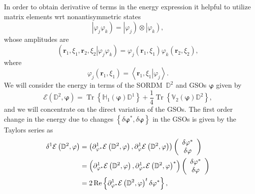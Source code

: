 \documentclass[aps,preprint]{revtex4}%
\begin{document}
In order to obtain derivative of terms in the energy expression it helpful to
utilize matrix elements wrt nonantisymmetric states
\begin{equation}
\left\vert \varphi_{j}\varphi_{k}\right)  =\left\vert \varphi_{j}\right)
\otimes\left\vert \varphi_{k}\right)  ,
\end{equation}
whose amplitudes are
\begin{equation}
\left(  \left.  \mathbf{r}_{1},\xi_{1},\mathbf{r}_{2},\xi_{2}\right\vert
\varphi_{j}\varphi_{k}\right)  =\varphi_{j}\left(  \mathbf{r}_{1},\xi
_{1}\right)  \varphi_{k}\left(  \mathbf{r}_{2},\xi_{2}\right)  ,
\end{equation}
where
\begin{equation}
\varphi_{j}\left(  \mathbf{r}_{1},\xi_{1}\right)  =\left\langle \left.
\mathbf{r}_{1},\xi_{1}\right\vert \varphi_{j}\right\rangle .
\end{equation}
We will consider the energy in terms of the SORDM\ $\mathbb{D}^{2}$ and GSOs
$\mathbf{\varphi}$ given by
\begin{equation}
\mathcal{E}\left(  \mathbb{D}^{2},\mathbf{\varphi}\right)  =\operatorname{Tr}%
\left\{  \mathbb{H}_{1}\left(  \mathbf{\varphi}\right)  \mathbb{D}%
^{1}\right\}  +\frac{1}{4}\operatorname{Tr}\left\{  \mathbb{V}_{2}\left(
\mathbf{\varphi}\right)  \mathbb{D}^{2}\right\}  , \label{e1}%
\end{equation}
and we will concentrate on the direct variation of the GSOs. The first order
change in the energy due to changes $\left\{  \delta\mathbf{\varphi}^{\ast
},\delta\mathbf{\varphi}\right\}  $ in the GSOs is given by the Taylors series
as
\begin{align}
\delta^{1}\mathcal{E}\left(  \mathbb{D}^{2},\mathbf{\varphi}\right)   &
=\left(  \partial_{\mathbf{\varphi}^{\ast}}^{1}\mathcal{E}\left(
\mathbb{D}^{2},\mathbf{\varphi}\right)  ,\partial_{\mathbf{\varphi}}%
^{1}\mathcal{E}\left(  \mathbb{D}^{2},\mathbf{\varphi}\right)  \right)
\left(
\begin{array}
[c]{c}%
\delta\mathbf{\varphi}^{\ast}\\
\delta\mathbf{\varphi}%
\end{array}
\right) \nonumber\\
&  =\left(  \partial_{\mathbf{\varphi}^{\ast}}^{1}\mathcal{E}\left(
\mathbb{D}^{2},\mathbf{\varphi}\right)  ,\partial_{\mathbf{\varphi}^{\ast}%
}^{1}\mathcal{E}\left(  \mathbb{D}^{2},\mathbf{\varphi}\right)  ^{\ast
}\right)  \left(
\begin{array}
[c]{c}%
\delta\mathbf{\varphi}^{\ast}\\
\delta\mathbf{\varphi}%
\end{array}
\right) \nonumber\\
&  =2\operatorname{Re}\left\{  \partial_{\mathbf{\varphi}^{\ast}}%
^{1}\mathcal{E}\left(  \mathbb{D}^{2},\mathbf{\varphi}\right)  ^{t}%
\delta\mathbf{\varphi}^{\ast}\right\}  ,
\end{align}
\end{document}
